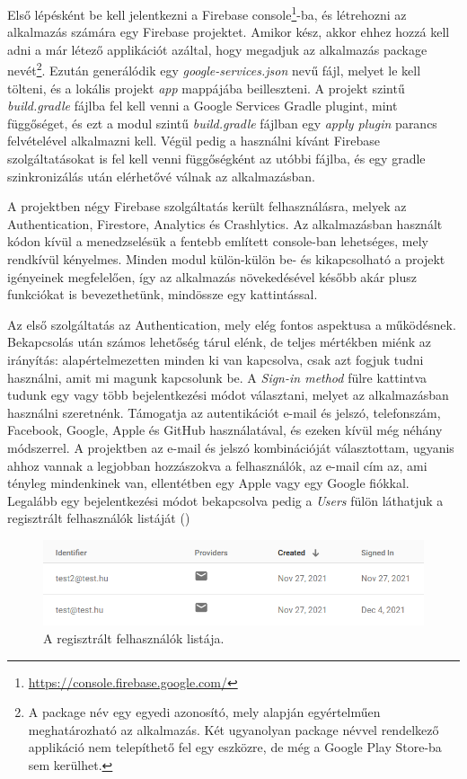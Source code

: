 Első lépésként be kell jelentkezni a Firebase console\footnote{\url{https://console.firebase.google.com/}}-ba, és létrehozni az alkalmazás számára egy Firebase projektet. Amikor kész, akkor ehhez hozzá kell adni a már létező applikációt azáltal, hogy megadjuk az alkalmazás package nevét\footnote{A package név egy egyedi azonosító, mely alapján egyértelműen meghatározható az alkalmazás. Két ugyanolyan package névvel rendelkező applikáció nem telepíthető fel egy eszközre, de még a Google Play Store-ba sem kerülhet.}. Ezután generálódik egy \emph{google-services.json} nevű fájl, melyet le kell tölteni, és a lokális projekt \emph{app} mappájába beilleszteni. A projekt szintű \emph{build.gradle} fájlba fel kell venni a Google Services Gradle plugint, mint függőséget, és ezt a modul szintű \emph{build.gradle} fájlban egy \emph{apply plugin} parancs felvételével alkalmazni kell. Végül pedig a használni kívánt Firebase szolgáltatásokat is fel kell venni függőségként az utóbbi fájlba, és egy gradle szinkronizálás után elérhetővé válnak az alkalmazásban.

A projektben négy Firebase szolgáltatás került felhasználásra, melyek az Authentication, Firestore, Analytics és Crashlytics. Az alkalmazásban használt kódon kívül a menedzselésük a fentebb említett console-ban lehetséges, mely rendkívül kényelmes. Minden modul külön-külön be- és kikapcsolható a projekt igényeinek megfelelően, így az alkalmazás növekedésével később akár plusz funkciókat is bevezethetünk, mindössze egy kattintással.

Az első szolgáltatás az Authentication, mely elég fontos aspektusa a működésnek. Bekapcsolás után számos lehetőség tárul elénk, de teljes mértékben miénk az irányítás: alapértelmezetten minden ki van kapcsolva, csak azt fogjuk tudni használni, amit mi magunk kapcsolunk be. A \emph{Sign-in method} fülre kattintva tudunk egy vagy több bejelentkezési módot választani, melyet az alkalmazásban használni szeretnénk. Támogatja az autentikációt e-mail és jelszó, telefonszám, Facebook, Google, Apple és GitHub használatával, és ezeken kívül még néhány módszerrel. A projektben az e-mail és jelszó kombinációját választottam, ugyanis ahhoz vannak a legjobban hozzászokva a felhasználók, az e-mail cím az, ami tényleg mindenkinek van, ellentétben egy Apple vagy egy Google fiókkal. Legalább egy bejelentkezési módot bekapcsolva pedig a \emph{Users} fülön láthatjuk a regisztrált felhasználók listáját ()

\begin{figure}[!ht]
	\centering
	\includegraphics[width=120mm, keepaspectratio]{figures/auth_users.png}
	\caption{A regisztrált felhasználók listája.}
	\label{fig:AuthUsers}
\end{figure}

